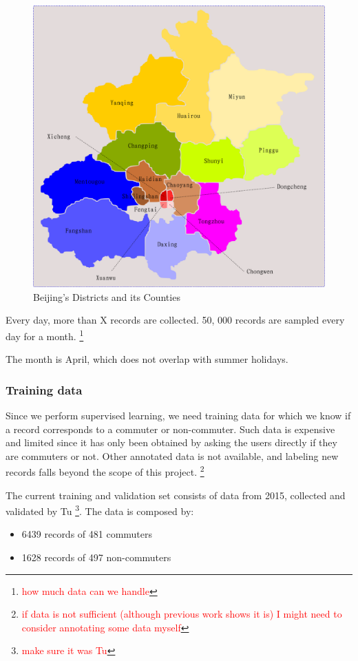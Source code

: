 \documentclass{article}
\newcommand{\selfnote}[1]{\footnote{\textcolor{red}{#1}}}
\begin{document}
\begin{figure}[H]
  \centering
  \includegraphics[width=.8\linewidth]{./images/beijing_18areas.png}
  \caption{Beijing's Districts and its Counties}
  \label{fig:beijing/18areas}
\end{figure}

Every day, more than X records are collected. 50, 000 records are sampled every day for a month. 
\selfnote{how much data can we handle}

The month is April, which does not overlap with summer holidays. 

\subsubsection{Training data}
Since we perform supervised learning, we need training data for which we know if a record corresponds to a commuter or non-commuter. Such data is expensive and limited since it has only been obtained by asking the users directly if they are commuters or not. Other annotated data is not available, and labeling new records falls beyond the scope of this project. \selfnote{if data is not sufficient (although previous work shows it is) I might need to consider annotating some data myself}

The current training and validation set consists of data from 2015, collected and validated by Tu \cite{tu2016impact} \selfnote{make sure it was Tu}. The data is composed by:

\begin{itemize}
\item 6439 records of 481 commuters
\item 1628 records of 497 non-commuters
\end{itemize}
\end{document}
